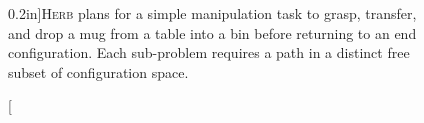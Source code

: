 \begin{figure}[t]
   \centering
   \;%
   \;%
   \caption[][0.2in]{\textsc{Herb} plans for a simple manipulation task
      to grasp, transfer, and drop a mug from a table into a bin
      before returning to an end configuration.
      Each sub-problem requires a path in a distinct free subset of
      configuration space.}
   \label{fig:intro-multi-part}
\end{figure}

